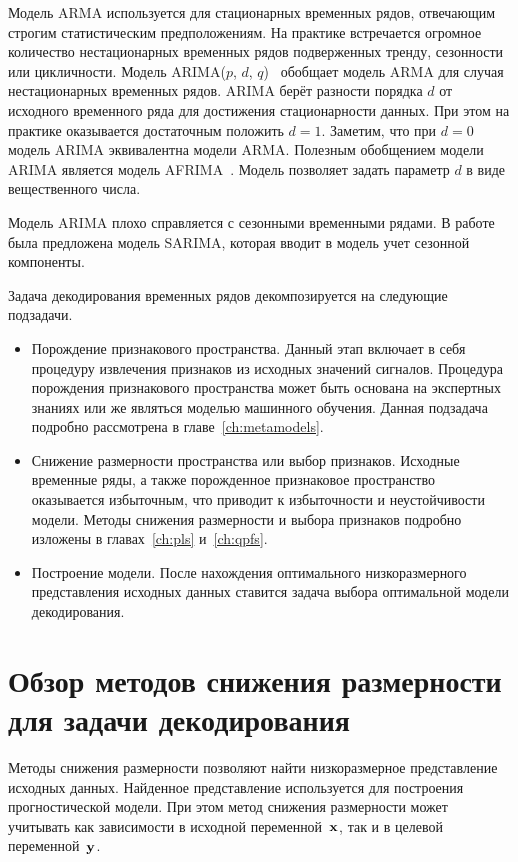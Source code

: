 Модель ARMA используется для стационарных временных рядов, отвечающим строгим статистическим предположениям. 
На практике встречается огромное количество нестационарных временных рядов подверженных тренду, сезонности или цикличности.
Модель ARIMA($p$, $d$, $q$)~\cite{cochrane2005time} обобщает модель ARMA для случая нестационарных временных рядов.
ARIMA берёт разности порядка $d$ от исходного временного ряда для достижения стационарности данных. 
При этом на практике оказывается достаточным положить $d = 1$.
Заметим, что при $d = 0$ модель ARIMA эквивалентна модели ARMA. 
Полезным обобщением модели ARIMA является модель AFRIMA~\cite{galbraith2001autoregression}. 
Модель позволяет задать параметр $d$ в виде вещественного числа.

Модель ARIMA плохо справляется с сезонными временными рядами.
В работе~\cite{box2011time} была предложена модель SARIMA, которая вводит в модель учет сезонной компоненты.

Задача декодирования временных рядов декомпозируется на следующие подзадачи.
\begin{itemize}
	\item Порождение признакового пространства. 
	Данный этап включает в себя процедуру извлечения признаков из исходных значений сигналов. 
	Процедура порождения признакового пространства может быть основана на экспертных знаниях или же являться моделью машинного обучения. 
	Данная подзадача подробно рассмотрена в главе~\ref{ch:metamodels}.
	
	\item Снижение размерности пространства или выбор признаков. 
	Исходные временные ряды, а также порожденное признаковое пространство оказывается избыточным, что приводит к избыточности и неустойчивости модели. 
	Методы снижения размерности и выбора признаков подробно изложены в главах~\ref{ch:pls} и~\ref{ch:qpfs}.
	
	\item Построение модели.
	После нахождения оптимального низкоразмерного представления исходных данных ставится задача выбора оптимальной модели декодирования.
\end{itemize}

\section{Обзор методов снижения размерности для задачи декодирования}
\label{sec:ch1:dim_reduction}
Методы снижения размерности позволяют найти низкоразмерное представление исходных данных. 
Найденное представление используется для построения прогностической модели.
При этом метод снижения размерности может учитывать как зависимости в исходной переменной~$\mathbf{x}$, так и в целевой переменной~$\mathbf{y}$.

